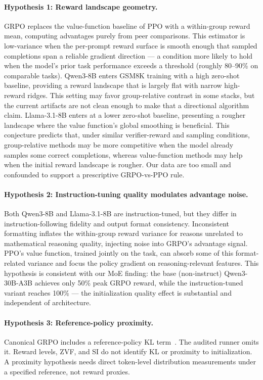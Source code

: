 \paragraph{Hypothesis 1: Reward landscape geometry.}
GRPO replaces the value-function baseline of PPO with a within-group reward
mean, computing advantages purely from peer comparisons.
This estimator is low-variance when the per-prompt reward surface is smooth
enough that sampled completions span a reliable gradient direction --- a
condition more likely to hold when the model's prior task performance exceeds a
threshold (roughly 80--90\% on comparable tasks).
Qwen3-8B enters GSM8K training with a high zero-shot baseline, providing a
reward landscape that is largely flat with narrow high-reward ridges.  This
setting may favor group-relative contrast in some stacks, but the current
artifacts are not clean enough to make that a directional algorithm claim.
Llama-3.1-8B enters at a lower zero-shot baseline, presenting a rougher
landscape where the value function's global smoothing is beneficial.
This conjecture predicts that, under similar verifier-reward and sampling
conditions, group-relative methods may be more competitive when the model
already samples some correct completions, whereas value-function methods may
help when the initial reward landscape is rougher. Our data are too small and
confounded to support a prescriptive GRPO-vs-PPO rule.

\paragraph{Hypothesis 2: Instruction-tuning quality modulates advantage noise.}
Both Qwen3-8B and Llama-3.1-8B are instruction-tuned, but they differ in
instruction-following fidelity and output format consistency.
Inconsistent formatting inflates the within-group reward variance for reasons
unrelated to mathematical reasoning quality, injecting noise into GRPO's
advantage signal.
PPO's value function, trained jointly on the task, can absorb some of this
format-related variance and focus the policy gradient on reasoning-relevant
features.
This hypothesis is consistent with our MoE finding: the base (non-instruct)
Qwen3-30B-A3B achieves only 50\% peak GRPO reward, while the instruction-tuned
variant reaches 100\% --- the initialization quality effect is substantial and
independent of architecture.

\paragraph{Hypothesis 3: Reference-policy proximity.}
Canonical GRPO includes a reference-policy KL term~\citep{shao2024deepseekmath}.
The audited runner omits it. Reward levels, ZVF, and SI do not identify KL or
proximity to initialization. A proximity hypothesis needs direct token-level
distribution measurements under a specified reference, not reward proxies.

